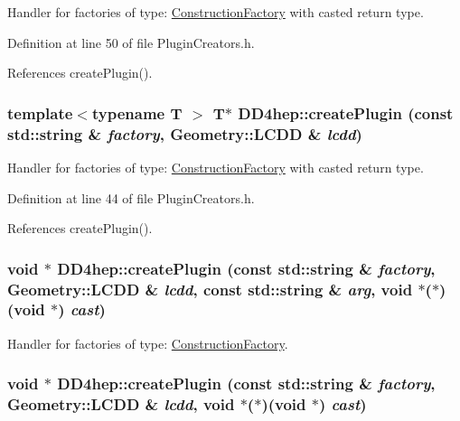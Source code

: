 Handler for factories of type: \hyperlink{class_d_d4hep_1_1_construction_factory}{ConstructionFactory} with casted return type. 

Definition at line 50 of file PluginCreators.h.

References createPlugin().\hypertarget{namespace_d_d4hep_a791eae2f449f1711c9d09d9cb82069d7}{
\subsubsection[{createPlugin}]{\setlength{\rightskip}{0pt plus 5cm}template$<$typename T $>$ {\bf T}$\ast$ DD4hep::createPlugin (const std::string \& {\em factory}, \/  Geometry::LCDD \& {\em lcdd})}}
\label{namespace_d_d4hep_a791eae2f449f1711c9d09d9cb82069d7}


Handler for factories of type: \hyperlink{class_d_d4hep_1_1_construction_factory}{ConstructionFactory} with casted return type. 

Definition at line 44 of file PluginCreators.h.

References createPlugin().\hypertarget{namespace_d_d4hep_a65c21de63646aa8b39d14ad64e75528e}{
\subsubsection[{createPlugin}]{\setlength{\rightskip}{0pt plus 5cm}void $\ast$ DD4hep::createPlugin (const std::string \& {\em factory}, \/  Geometry::LCDD \& {\em lcdd}, \/  const std::string \& {\em arg}, \/  void $\ast$($\ast$)(void $\ast$) {\em cast})}}
\label{namespace_d_d4hep_a65c21de63646aa8b39d14ad64e75528e}


Handler for factories of type: \hyperlink{class_d_d4hep_1_1_construction_factory}{ConstructionFactory}. \hypertarget{namespace_d_d4hep_a65fff585aba587323f89c263548cad90}{
\subsubsection[{createPlugin}]{\setlength{\rightskip}{0pt plus 5cm}void $\ast$ DD4hep::createPlugin (const std::string \& {\em factory}, \/  Geometry::LCDD \& {\em lcdd}, \/  void $\ast$($\ast$)(void $\ast$) {\em cast})}}
\label{namespace_d_d4hep_a65fff585aba587323f89c263548cad90}


